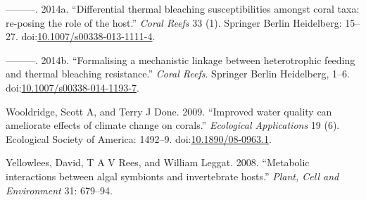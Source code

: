 \documentclass[]{elsarticle} %
\begin{document}
\hypertarget{ref-Wooldridge:2014di}{}
---------. 2014a. ``Differential thermal bleaching susceptibilities
amongst coral taxa: re-posing the role of the host.'' \emph{Coral Reefs}
33 (1). Springer Berlin Heidelberg: 15--27.
doi:\href{https://doi.org/10.1007/s00338-013-1111-4}{10.1007/s00338-013-1111-4}.

\hypertarget{ref-Wooldridge:2014hc}{}
---------. 2014b. ``Formalising a mechanistic linkage between
heterotrophic feeding and thermal bleaching resistance.'' \emph{Coral
Reefs}. Springer Berlin Heidelberg, 1--6.
doi:\href{https://doi.org/10.1007/s00338-014-1193-7}{10.1007/s00338-014-1193-7}.

\hypertarget{ref-Wooldridge:2009kb}{}
Wooldridge, Scott A, and Terry J Done. 2009. ``Improved water quality
can ameliorate effects of climate change on corals.'' \emph{Ecological
Applications} 19 (6). Ecological Society of America: 1492--9.
doi:\href{https://doi.org/10.1890/08-0963.1}{10.1890/08-0963.1}.

\hypertarget{ref-Yellowlees:2008p331}{}
Yellowlees, David, T A V Rees, and William Leggat. 2008. ``Metabolic
interactions between algal symbionts and invertebrate hosts.''
\emph{Plant, Cell and Environment} 31: 679--94.
\end{document}
